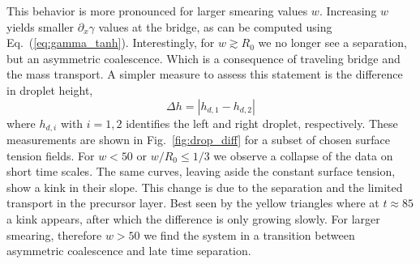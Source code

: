 \documentclass[twocolumn,amsmath,amssymb,showpacs,pre,nofootinbib,superscriptaddress]{revtex4-1} %
\begin{document}
This behavior is more pronounced for larger smearing values $w$.
Increasing $w$ yields smaller $\partial_x\gamma$ values at the bridge, as can be computed using Eq.~(\ref{eq:gamma_tanh}). 
Interestingly, for $w\gtrsim R_0$ we no longer see a separation, but an asymmetric coalescence.
Which is a consequence of traveling bridge and the mass transport.
A simpler measure to assess this statement is the difference in droplet height,
\begin{equation}\label{eq:drop_diff_h}
    \Delta h = |h_{d,1} - h_{d,2}|
\end{equation}
where $h_{d,i}$ with $i=1,2$ identifies the left and right droplet, respectively.
These measurements are shown in Fig.~\ref{fig:drop_diff} for a subset of chosen surface tension fields.
For $w < 50$ or $w/R_0 \le 1/3$ we observe a collapse of the data on short time scales.
The same curves, leaving aside the constant surface tension, show a kink in their slope.
This change is due to the separation and the limited transport in the precursor layer.
Best seen by the yellow triangles where at $t \approx 85$ a kink appears, after which the difference is only growing slowly.
For larger smearing, therefore $w > 50$ we find the system in a transition between asymmetric coalescence and late time separation.
\end{document}
